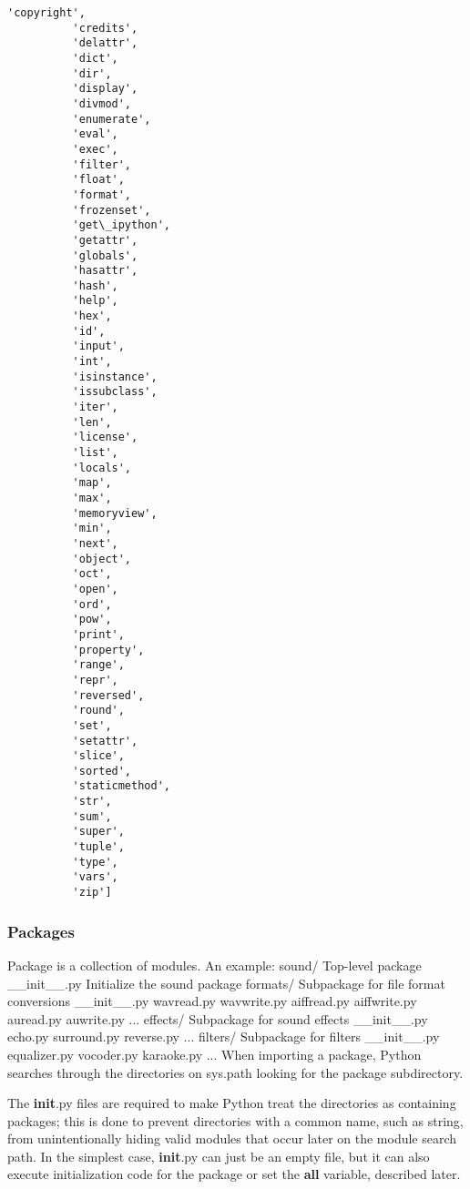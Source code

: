 \documentclass[11pt]{article}
\begin{document}
\begin{Verbatim}[commandchars=\\\{\}]
          'copyright',
          'credits',
          'delattr',
          'dict',
          'dir',
          'display',
          'divmod',
          'enumerate',
          'eval',
          'exec',
          'filter',
          'float',
          'format',
          'frozenset',
          'get\_ipython',
          'getattr',
          'globals',
          'hasattr',
          'hash',
          'help',
          'hex',
          'id',
          'input',
          'int',
          'isinstance',
          'issubclass',
          'iter',
          'len',
          'license',
          'list',
          'locals',
          'map',
          'max',
          'memoryview',
          'min',
          'next',
          'object',
          'oct',
          'open',
          'ord',
          'pow',
          'print',
          'property',
          'range',
          'repr',
          'reversed',
          'round',
          'set',
          'setattr',
          'slice',
          'sorted',
          'staticmethod',
          'str',
          'sum',
          'super',
          'tuple',
          'type',
          'vars',
          'zip']
\end{Verbatim}
            
    \subsubsection{Packages}\label{packages}

    Package is a collection of modules. An example:
sound/                          Top-level package
      __init__.py               Initialize the sound package
      formats/                  Subpackage for file format conversions
              __init__.py
              wavread.py
              wavwrite.py
              aiffread.py
              aiffwrite.py
              auread.py
              auwrite.py
              ...
      effects/                  Subpackage for sound effects
              __init__.py
              echo.py
              surround.py
              reverse.py
              ...
      filters/                  Subpackage for filters
              __init__.py
              equalizer.py
              vocoder.py
              karaoke.py
              ...
    When importing a package, Python searches through the directories on
sys.path looking for the package subdirectory.

The \textbf{init}.py files are required to make Python treat the
directories as containing packages; this is done to prevent directories
with a common name, such as string, from unintentionally hiding valid
modules that occur later on the module search path. In the simplest
case, \textbf{init}.py can just be an empty file, but it can also
execute initialization code for the package or set the \textbf{all}
variable, described later.
\end{document}
